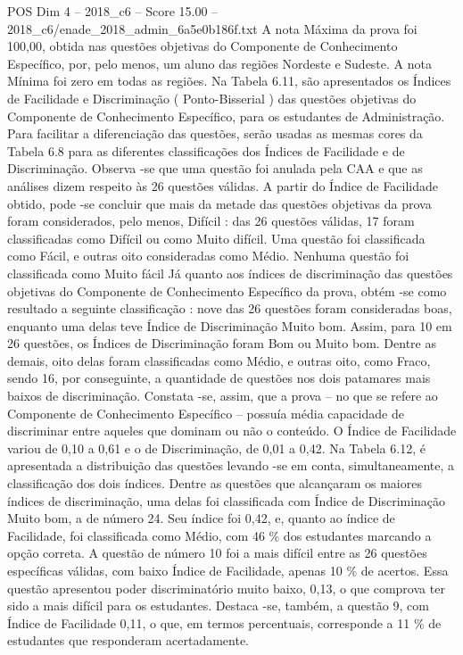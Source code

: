 \begin{textsample}{POS Dim 4 – 2018\_c6 – Score 15.00 – 2018\_c6/enade\_2018\_admin\_6a5e0b186f.txt}
A nota Máxima da prova foi 100,00, obtida nas questões objetivas do Componente de Conhecimento Específico, por, pelo menos, um aluno das regiões Nordeste e Sudeste.
A nota Mínima foi zero em todas as regiões.
Na Tabela 6.11, são apresentados os Índices de Facilidade e Discriminação ( Ponto-Bisserial ) das questões objetivas do Componente de Conhecimento Específico, para os estudantes de Administração.
Para facilitar a diferenciação das questões, serão usadas as mesmas cores da Tabela 6.8 para as diferentes classificações dos Índices de Facilidade e de Discriminação.
Observa -se que uma questão foi anulada pela CAA e que as análises dizem respeito às 26 questões válidas.
A partir do Índice de Facilidade obtido, pode -se concluir que mais da metade das questões objetivas da prova foram considerados, pelo menos, Difícil : das 26 questões válidas, 17 foram classificadas como Difícil ou como Muito difícil.
Uma questão foi classificada como Fácil, e outras oito consideradas como Médio.
Nenhuma questão foi classificada como Muito fácil Já quanto aos índices de discriminação das questões objetivas do Componente de Conhecimento Específico da prova, obtém -se como resultado a seguinte classificação : nove das 26 questões foram consideradas boas, enquanto uma delas teve Índice de Discriminação Muito bom.
Assim, para 10 em 26 questões, os Índices de Discriminação foram Bom ou Muito bom.
Dentre as demais, oito delas foram classificadas como Médio, e outras oito, como Fraco, sendo 16, por conseguinte, a quantidade de questões nos dois patamares mais baixos de discriminação.
Constata -se, assim, que a prova – no que se refere ao Componente de Conhecimento Específico – possuía média capacidade de discriminar entre aqueles que dominam ou não o conteúdo.
O Índice de Facilidade variou de 0,10 a 0,61 e o de Discriminação, de 0,01 a 0,42.
Na Tabela 6.12, é apresentada a distribuição das questões levando -se em conta, simultaneamente, a classificação dos dois índices.
Dentre as questões que alcançaram os maiores índices de discriminação, uma delas foi classificada com Índice de Discriminação Muito bom, a de número 24.
Seu índice foi 0,42, e, quanto ao índice de Facilidade, foi classificada como Médio, com 46 \% dos estudantes marcando a opção correta.
A questão de número 10 foi a mais difícil entre as 26 questões específicas válidas, com baixo Índice de Facilidade, apenas 10 \% de acertos.
Essa questão apresentou poder discriminatório muito baixo, 0,13, o que comprova ter sido a mais difícil para os estudantes.
Destaca -se, também, a questão 9, com Índice de Facilidade 0,11, o que, em termos percentuais, corresponde a 11 \% de estudantes que responderam acertadamente.

\end{textsample}
